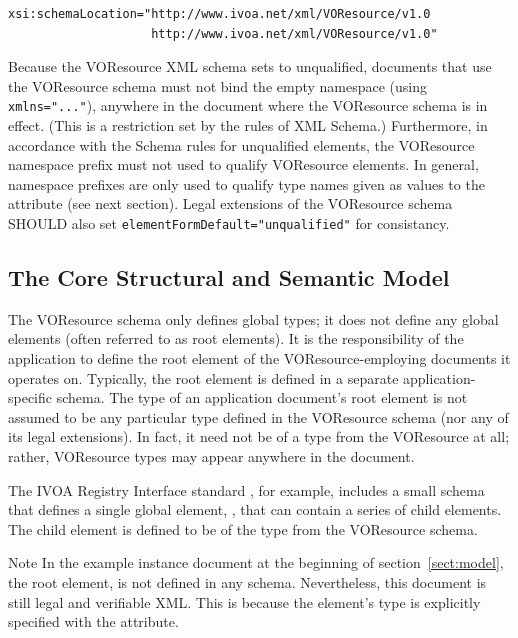 \documentclass[11pt,a4paper]{ivoa}
\begin{document}
\begin{verbatim}
xsi:schemaLocation="http://www.ivoa.net/xml/VOResource/v1.0
                    http://www.ivoa.net/xml/VOResource/v1.0"
\end{verbatim}

Because the VOResource XML schema sets  to
unqualified, documents that use the VOResource schema must not bind the
empty namespace (using \verb|xmlns="..."|), anywhere in the document
where the VOResource schema is in effect.  (This is a restriction set by
the rules of XML Schema.)  Furthermore, in accordance with the Schema
rules for unqualified elements, the VOResource namespace prefix must not
used to qualify VOResource elements.  In general, namespace prefixes are
only used to qualify type names given as values to the 
attribute (see next section).  Legal extensions of the VOResource schema
SHOULD also set \verb|elementFormDefault="unqualified"| for consistancy.



\subsection{The Core Structural and Semantic Model}
\label{sect:core}

The VOResource schema only defines global types; it does not define
any global elements (often referred to as root elements).  It is the
responsibility of the application to define the root element of the
VOResource-employing documents it operates on.  Typically, the root
element is defined in a separate application-specific schema.  The
type of an application document's root element is not assumed to be
any particular type defined in the VOResource schema (nor any of its
legal extensions).  In fact, it need not be of a type from the
VOResource at all; rather, VOResource types may appear anywhere in the
document.   

The IVOA Registry Interface standard \citep{2009ivoa.spec.1104B}, 
for example, includes a
small schema that defines a single global element,
, that can contain a series of
 child elements.  The child
element is defined to be of the type  from
the VOResource schema.

\begin{admonition}{Note}
In the example instance
document at the beginning of section~\ref{sect:model}, the root element,
 is not defined in any schema.
Nevertheless, this document is still legal and verifiable XML.
This is because the element's type is explicitly specified with
the  attribute.
\end{admonition}
\end{document}
